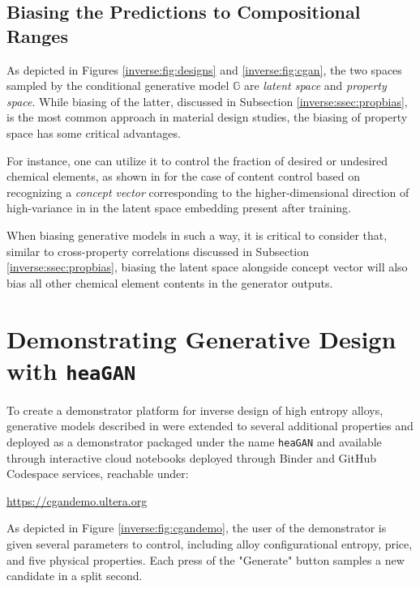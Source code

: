 \subsection{Biasing the Predictions to Compositional Ranges} \label{inverse:ssec:compbias}

As depicted in Figures \ref{inverse:fig:designs} and \ref{inverse:fig:cgan}, the two spaces sampled by the conditional generative model $\mathbb{G}$ are \emph{latent space} and \emph{property space}. While biasing of the latter, discussed in Subsection \ref{inverse:ssec:propbias}, is the most common approach in material design studies, the biasing of property space has some critical advantages.

For instance, one can utilize it to control the fraction of desired or undesired chemical elements, as shown in \citet{Debnath2023ComparingAlloys} for the case of  content control based on recognizing a \emph{concept vector} corresponding to the higher-dimensional direction of high-variance in  in the latent space embedding present after training. 

When biasing generative models in such a way, it is critical to consider that, similar to cross-property correlations discussed in Subsection \ref{inverse:ssec:propbias}, biasing the latent space alongside  concept vector will also bias all other chemical element contents in the generator outputs.


\section{Demonstrating Generative Design with \texttt{heaGAN}} \label{inverse:sec:heagan}

To create a demonstrator platform for inverse design of high entropy alloys, generative models described in \citet{Debnath2023ComparingAlloys} were extended to several additional properties and deployed as a demonstrator packaged under the name \texttt{heaGAN} and available through interactive cloud notebooks deployed through Binder and GitHub Codespace services, reachable under:

\hspace{36pt}\href{https://cgandemo.ultera.org}{https://cgandemo.ultera.org}

As depicted in Figure \ref{inverse:fig:cgandemo}, the user of the demonstrator is given several parameters to control, including alloy configurational entropy, price, and five physical properties. Each press of the "Generate" button samples a new candidate in a split second.

